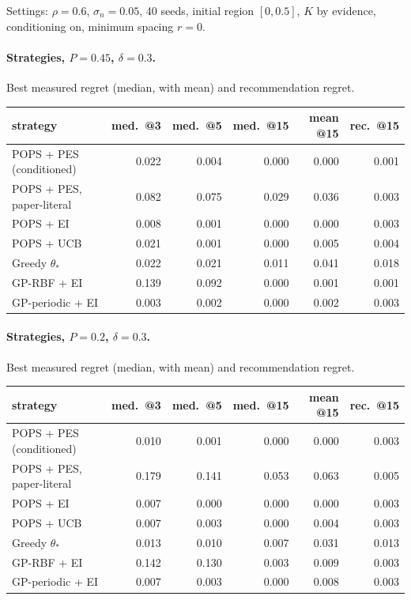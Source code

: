 \noindent Settings: $\rho=0.6$, $\sigma_n=0.05$, 40 seeds, initial region $[0,0.5]$, $K$ by evidence, conditioning on, minimum spacing $r=0$.

\paragraph{Strategies, $P=0.45$, $\delta=0.3$.} Best measured regret (median, with mean) and recommendation regret.

\begin{center}\small\begin{tabular}{lrrrrr}\toprule
strategy & med.\ @3 & med.\ @5 & med.\ @15 & mean @15 & rec.\ @15\\\midrule
POPS + PES (conditioned) & 0.022 & 0.004 & 0.000 & 0.000 & 0.001\\
POPS + PES, paper-literal & 0.082 & 0.075 & 0.029 & 0.036 & 0.003\\
POPS + EI & 0.008 & 0.001 & 0.000 & 0.000 & 0.003\\
POPS + UCB & 0.021 & 0.001 & 0.000 & 0.005 & 0.004\\
Greedy $\theta_*$ & 0.022 & 0.021 & 0.011 & 0.041 & 0.018\\
GP-RBF + EI & 0.139 & 0.092 & 0.000 & 0.001 & 0.001\\
GP-periodic + EI & 0.003 & 0.002 & 0.000 & 0.002 & 0.003\\
\bottomrule\end{tabular}\end{center}

\paragraph{Strategies, $P=0.2$, $\delta=0.3$.} Best measured regret (median, with mean) and recommendation regret.

\begin{center}\small\begin{tabular}{lrrrrr}\toprule
strategy & med.\ @3 & med.\ @5 & med.\ @15 & mean @15 & rec.\ @15\\\midrule
POPS + PES (conditioned) & 0.010 & 0.001 & 0.000 & 0.000 & 0.003\\
POPS + PES, paper-literal & 0.179 & 0.141 & 0.053 & 0.063 & 0.005\\
POPS + EI & 0.007 & 0.000 & 0.000 & 0.000 & 0.003\\
POPS + UCB & 0.007 & 0.003 & 0.000 & 0.004 & 0.003\\
Greedy $\theta_*$ & 0.013 & 0.010 & 0.007 & 0.031 & 0.013\\
GP-RBF + EI & 0.142 & 0.130 & 0.003 & 0.009 & 0.003\\
GP-periodic + EI & 0.007 & 0.003 & 0.000 & 0.008 & 0.003\\
\bottomrule\end{tabular}\end{center}

